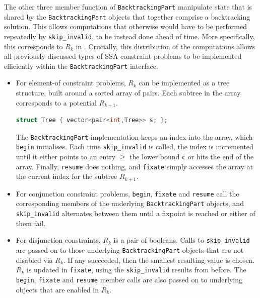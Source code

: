     The other three member function of \texttt{BacktrackingPart} manipulate
    state that is shared by the \texttt{BacktrackingPart} objects
    that together comprise a backtracking solution.
    This allows computations that otherwise would have to be performed
    repeatedly by \texttt{skip\_invalid}, to be instead done ahead
    of time.
    More specifically, this corresponds to $R_k$ in
    .
    Crucially, this distribution of the computations allows all previously
    discussed types of SSA constraint problems to be implemented efficiently
    within the {\tt BacktrackingPart} interface.

    \begin{itemize}
    \item For element-of constraint problems, $R_k$ can be implemented as a
          tree structure, built around a sorted array of pairs.
          Each subtree in the array corresponds to a potential $R_{k+1}$.
          \begin{lstlisting}[language=C++]
struct Tree { vector<pair<int,Tree>> s; };
          \end{lstlisting}
          The \texttt{BacktrackingPart} implementation keeps an index into
          the array, which \texttt{begin} initialises.
          Each time \texttt{skip\_invalid} is called, the index is incremented
          until it either points to an entry $\geq$ the lower bound \texttt{c}
          or hits the end of the array.
          Finally, \texttt{resume} does nothing, and \texttt{fixate} simply
          accesses the array at the current index for the subtree $R_{k+1}$.
    \item For conjunction constraint problems, \texttt{begin}, \texttt{fixate}
          and \texttt{resume} call the corresponding members of the underlying
          \texttt{BacktrackingPart} objects, and \texttt{skip\_invalid}
          alternates between them until a fixpoint is reached or
          either of them fail.
    \item For disjunction constraints, $R_k$ is a pair of booleans.
          Calls to \texttt{skip\_invalid} are passed on to those underlying
          \texttt{BacktrackingPart} objects that are not disabled via $R_k$.
          If any succeeded, then the smallest resulting value is chosen.
          $R_k$ is updated in \texttt{fixate}, using the \texttt{skip\_invalid}
          results from before.
          The \texttt{begin}, \texttt{fixate} and \texttt{resume} member
          calls are also passed on to underlying objects
          that are enabled in $R_k$.
    \end{itemize}

